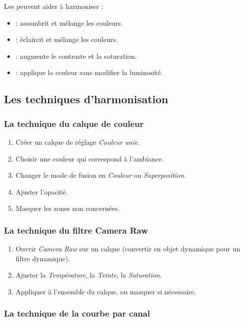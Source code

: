 Les  peuvent aider à harmoniser :

\begin{itemize}
    \item {} : assombrit et mélange les couleurs.
    \item {} : éclaircit et mélange les couleurs.
    \item {} : augmente le contraste et la saturation.
    \item {} : applique la couleur sans modifier la luminosité.
\end{itemize}

\subsection{Les techniques d'harmonisation}

\subsubsection{La technique du calque de couleur}

\begin{enumerate}
    \item Créer un calque de réglage \emph{Couleur unie}.
    \item Choisir une couleur qui correspond à l'ambiance.
    \item Changer le mode de fusion en \emph{Couleur} ou \emph{Superposition}.
    \item Ajuster l'opacité.
    \item Masquer les zones non concernées.
\end{enumerate}

\subsubsection{La technique du filtre Camera Raw}

\begin{enumerate}
    \item Ouvrir \emph{Camera Raw} sur un calque (convertir en objet dynamique pour un filtre dynamique).
    \item Ajuster la \emph{Température}, la \emph{Teinte}, la \emph{Saturation}.
    \item Appliquer à l'ensemble du calque, ou masquer si nécessaire.
\end{enumerate}

\subsubsection{La technique de la courbe par canal}

